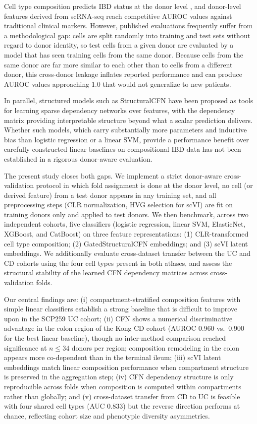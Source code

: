 \documentclass[11pt,letterpaper]{article}
\begin{document}
Cell type composition predicts IBD status at the donor level \citep{smillie2019intra},
and donor-level features derived from scRNA-seq reach competitive AUROC values
against traditional clinical markers. However, published evaluations frequently
suffer from a methodological gap: cells are split randomly into training and
test sets without regard to donor identity, so test cells from a given donor
are evaluated by a model that has seen training cells from the same donor.
Because cells from the same donor are far more similar to each other than to
cells from a different donor, this cross-donor leakage inflates reported
performance and can produce AUROC values approaching 1.0 that would not
generalize to new patients.

In parallel, structured models such as StructuralCFN \citep{li2023structural}
have been proposed as tools for learning sparse dependency networks over
features, with the dependency matrix providing interpretable structure beyond
what a scalar prediction delivers. Whether such models, which carry
substantially more parameters and inductive bias than logistic regression or a
linear SVM, provide a performance benefit over carefully constructed
linear baselines on compositional IBD data has not been established in a
rigorous donor-aware evaluation.

The present study closes both gaps. We implement a strict donor-aware
cross-validation protocol in which fold assignment is done at the donor level,
no cell (or derived feature) from a test donor appears in any training set, and
all preprocessing steps (CLR normalization, HVG selection for scVI) are fit on
training donors only and applied to test donors. We then benchmark, across two
independent cohorts, five classifiers (logistic regression, linear SVM,
ElasticNet, XGBoost, and CatBoost) on three feature representations: (1)
CLR-transformed cell type composition; (2) GatedStructuralCFN embeddings; and
(3) scVI latent embeddings. We additionally evaluate cross-dataset transfer
between the UC and CD cohorts using the four cell types present in both atlases,
and assess the structural stability of the learned CFN dependency matrices
across cross-validation folds.

Our central findings are: (i) compartment-stratified composition features with
simple linear classifiers establish a strong baseline that is difficult to
improve upon in the SCP259 UC cohort; (ii) CFN shows a numerical discriminative advantage in the colon region of the Kong CD cohort (AUROC 0.960 vs.\ 0.900 for the best linear baseline), though no inter-method comparison reached significance at $n \leq 34$ donors per region; composition remodeling in the colon appears more co-dependent than in the terminal ileum; (iii) scVI latent embeddings match linear
composition performance when compartment structure is preserved in the
aggregation step; (iv) CFN dependency structure is only reproducible across
folds when composition is computed within compartments rather than globally;
and (v) cross-dataset transfer from CD to UC is feasible with four shared cell
types (AUC 0.833) but the reverse direction performs at chance, reflecting
cohort size and phenotypic diversity asymmetries.
\end{document}
